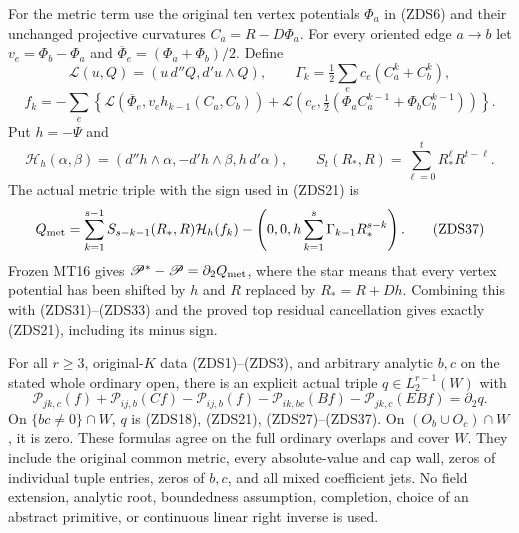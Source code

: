 For the metric term use the original ten vertex potentials
$\Phi_a$ in (ZDS6) and their unchanged projective curvatures
$C_a=R-D\Phi_a$.  For every oriented edge $a\to b$ let
$v_e=\Phi_b-\Phi_a$ and $\overline\Phi_e=(\Phi_a+\Phi_b)/2$.
Define
\[
 \mathcal L(u,Q)=(u\,d''Q,d'u\wedge Q),\qquad
 \Gamma_k=\tfrac12\sum_e c_e(C_a^k+C_b^k),
 \tag{ZDS34}
\]
\[
 f_k=-\sum_e\left\{
 \mathcal L(\overline\Phi_e,v_eh_{k-1}(C_a,C_b))
 +\mathcal L\left(c_e,
        \tfrac12(\Phi_aC_a^{k-1}+\Phi_bC_b^{k-1})\right)\right\}.
 \tag{ZDS35}
\]
Put $h=-\Psi$ and
\[
 \mathcal H_h(\alpha,\beta)=
 (d''h\wedge\alpha,-d'h\wedge\beta,h\,d'\alpha),\qquad
 S_t(R_*,R)=\sum_{\ell=0}^tR_*^\ell R^{t-\ell}.
 \tag{ZDS36}
\]
The actual metric triple with the sign used in (ZDS21) is
\[
 Q_{\rm met}=
 \sum_{k=1}^{s-1}S_{s-k-1}(R_*,R)\mathcal H_h(f_k)
 -\left(0,0,h\sum_{k=1}^s\Gamma_{k-1}R_*^{s-k}\right).
 \tag{ZDS37}
\]
Frozen MT16 gives $\mathscr P^*-\mathscr P=\partial_2Q_{\rm met}$,
where the star means that every vertex potential has been shifted
by $h$ and $R$ replaced by $R_*=R+Dh$.  Combining this with
(ZDS31)--(ZDS33) and the proved top residual cancellation gives
exactly (ZDS21), including its minus sign.

\begin{theorem}
For all $r\ge3$, original-$K$ data (ZDS1)--(ZDS3), and arbitrary
analytic $b,c$ on the stated whole ordinary open, there is an
explicit actual triple $q\in L_2^{r-1}(W)$ with
\[
 \boxed{\quad
 \mathcal P_{jk,c}(f)+\mathcal P_{ij,b}(Cf)
 -\mathcal P_{ij,b}(f)-\mathcal P_{ik,bc}(Bf)
 -\mathcal P_{jk,c}(EBf)=\partial_2q.
 \quad}
 \tag{ZDS38}
\]
On $\{bc\ne0\}\cap W$, $q$ is (ZDS18), (ZDS21),
(ZDS27)--(ZDS37).  On $(O_b\cup O_c)\cap W$, it is zero.
These formulas agree on the full ordinary overlaps and cover
$W$.  They include the original common metric, every absolute-value
and cap wall, zeros of individual tuple entries, zeros of $b,c$,
and all mixed coefficient jets.  No field extension, analytic
root, boundedness assumption, completion, choice of an abstract
primitive, or continuous linear right inverse is used.
\end{theorem}


